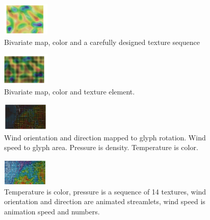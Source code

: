 \begin{mdframed}\begin{multicols}{4}
    \begin{figure}[H]
        \centering
        \includegraphics[width=0.2\textwidth]{color_and_texture_vis.png}
        \caption{Bivariate map, color and a carefully designed texture sequence}
    \end{figure}
    \begin{figure}[H]
        \centering
        \includegraphics[width=0.2\textwidth]{color_and_size_vis.png}
        \caption{Bivariate map, color and texture element.}
    \end{figure}
    \begin{figure}[H]
        \centering
        \includegraphics[width=0.2\textwidth]{weather1_vis.png}
        \caption{Wind orientation and direction mapped to glyph rotation. Wind
        speed to glyph area. Pressure is density. Temperature is color.}
    \end{figure}
    \begin{figure}[H]
        \centering
        \includegraphics[width=0.2\textwidth]{weather_texture_vis.png}
        \caption{Temperature is color, pressure is a sequence of 14 textures,
        wind orientation and direction are animated streamlets, wind speed is
    animation speed and numbers.}
    \end{figure}

\end{multicols}\end{mdframed}



